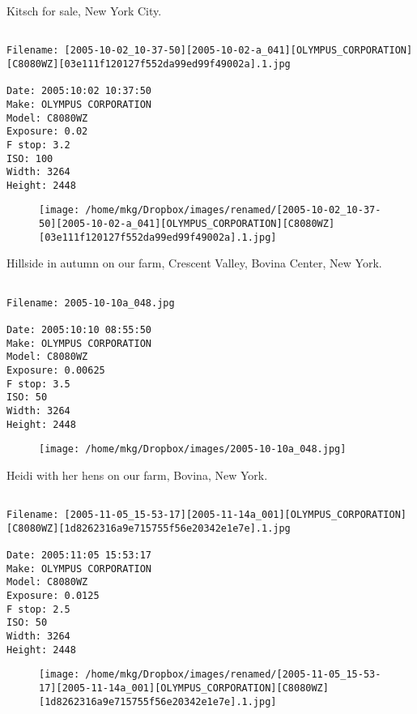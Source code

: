 \clearpage
\onecolumn
\noindent Kitsch for sale, New York City.
\noindent
\begin{lstlisting}

Filename: [2005-10-02_10-37-50][2005-10-02-a_041][OLYMPUS_CORPORATION][C8080WZ][03e111f120127f552da99ed99f49002a].1.jpg

Date: 2005:10:02 10:37:50
Make: OLYMPUS CORPORATION
Model: C8080WZ
Exposure: 0.02
F stop: 3.2
ISO: 100
Width: 3264
Height: 2448
\end{lstlisting}
\clearpage

\begin{figure}
\texttt{[image: /home/mkg/Dropbox/images/renamed/[2005-10-02\_10-37-50][2005-10-02-a\_041][OLYMPUS\_CORPORATION][C8080WZ][03e111f120127f552da99ed99f49002a].1.jpg]}
\end{figure}
    
\clearpage
\onecolumn
\noindent Hillside in autumn on our farm, Crescent Valley, Bovina Center, New York.
\noindent
\begin{lstlisting}

Filename: 2005-10-10a_048.jpg

Date: 2005:10:10 08:55:50
Make: OLYMPUS CORPORATION
Model: C8080WZ
Exposure: 0.00625
F stop: 3.5
ISO: 50
Width: 3264
Height: 2448
\end{lstlisting}
\clearpage

\begin{figure}
\texttt{[image: /home/mkg/Dropbox/images/2005-10-10a\_048.jpg]}
\end{figure}
    
\clearpage
\onecolumn
\noindent Heidi with her hens on our farm, Bovina, New York.
\noindent
\begin{lstlisting}

Filename: [2005-11-05_15-53-17][2005-11-14a_001][OLYMPUS_CORPORATION][C8080WZ][1d8262316a9e715755f56e20342e1e7e].1.jpg

Date: 2005:11:05 15:53:17
Make: OLYMPUS CORPORATION
Model: C8080WZ
Exposure: 0.0125
F stop: 2.5
ISO: 50
Width: 3264
Height: 2448
\end{lstlisting}
\clearpage

\begin{figure}
\texttt{[image: /home/mkg/Dropbox/images/renamed/[2005-11-05\_15-53-17][2005-11-14a\_001][OLYMPUS\_CORPORATION][C8080WZ][1d8262316a9e715755f56e20342e1e7e].1.jpg]}
\end{figure}
    
